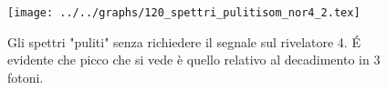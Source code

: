 \begin{figure}[h] \centering\texttt{[image: ../../graphs/120\_spettri\_pulitisom\_nor4\_2.tex]}\caption{Gli spettri "puliti" senza richiedere il segnale sul rivelatore 4. \'E evidente che picco che si vede è quello relativo al decadimento in 3 fotoni.}\label{gr:120_spettri_pulitisom_nor4_2} \end{figure}
